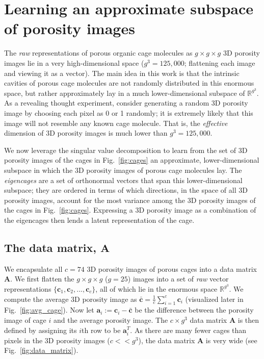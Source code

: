 \documentclass[journal=jacsat,manuscript=article,layout=traditional]{achemso}
\begin{document}
\section{Learning an approximate subspace of porosity images} 

The \emph{raw} representations of porous organic cage molecules as $g\times g \times g$ 3D porosity images lie in a very high-dimensional space ($g^3=125,000$; flattening each image and viewing it as a vector). The main idea in this work is that the intrinsic cavities of porous cage molecules are not randomly distributed in this enormous space, but rather approximately lay in a much lower-dimensional subspace of $\mathbb{R}^{g^3}$. As a revealing thought experiment, consider generating a random 3D porosity image by choosing each pixel as 0 or 1 {\color{red} randomly}; it is extremely likely that this image will not resemble any known cage molecule. That is, the \emph{effective} dimension of 3D porosity images is much lower than $g^3=125,000$. 

We now leverage the singular value decomposition \cite{muller2004singular,kalman1996singularly,strang1993introduction} to learn from the set of 3D porosity images of the cages in Fig.~\ref{fig:cages} an approximate, lower-dimensional subspace in which the 3D porosity images of porous cage molecules lay.
The \emph{eigencages} are a set of orthonormal vectors that span this lower-dimensional subspace; they are ordered in terms of which directions, in the space of all 3D porosity images, account for the most variance among the 3D porosity images of the cages in Fig.~\ref{fig:cages}. Expressing a 3D porosity image as a combination of the eigencages then lends a latent representation of the cage.

\subsection{The data matrix, $\mathbf{A}$} We encapsulate all $c=74$ 3D porosity images of porous cages into a data matrix $\mathbf{A}$. We first flatten the $g\times g\times g$ ($g=25$) images into a set of \emph{raw} vector representations $\{\mathbf{c}_1, \mathbf{c}_2, ..., \mathbf{c}_c\}$, all of which lie in the enormous space $\mathbb{R}^{g^3}$. 
We compute the average 3D porosity image as $\bar{\mathbf{c}}=\frac{1}{c}\sum_{i=1}^c  \mathbf{c}_i$ (visualized later in Fig.~\ref{fig:avg_cage}). Now let $\mathbf{a}_i:=\mathbf{c}_i-\bar{\mathbf{c}}$ be the difference between the porosity image of cage $i$ and the average porosity image. The $c \times g^3$ data matrix $\mathbf{A}$ is then defined by assigning its $i$th row to be $\mathbf{a}_i^T$. As there are many fewer cages than pixels in the 3D porosity images ($c<<g^3$), the data matrix $\mathbf{A}$ is very wide (see Fig.~\ref{fig:data_matrix}).
\end{document}
